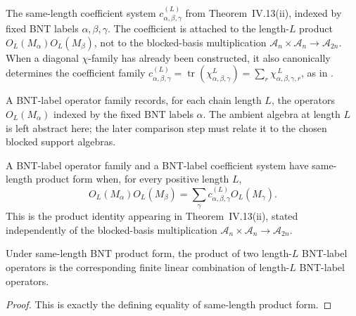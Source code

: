 \begin{definition}%
    \label{def:mpdo_bnt_label_coefficient_family}
    \leanok
    The same-length coefficient system
    $c^{(L)}_{\alpha,\beta,\gamma}$ from Theorem~IV.13(ii), indexed by
    fixed BNT labels $\alpha,\beta,\gamma$. The coefficient is attached to
    the length-$L$ product
    $O_L(M_\alpha)O_L(M_\beta)$, not to the blocked-basis multiplication
    $\mathcal A_n\times\mathcal A_n\to\mathcal A_{2n}$.
    When a diagonal $\chi$-family has already been constructed, it also
    canonically determines the coefficient family
    $c^{(L)}_{\alpha,\beta,\gamma}
        = \operatorname{tr}(\chi_{\alpha,\beta,\gamma}^{L})
        = \sum_r\chi_{\alpha,\beta,\gamma,r}^{\,L}$, as in
    \cite[Appendix~C.4]{Cirac2016MPDO_arXiv}.
\end{definition}

\begin{definition}%
    \label{def:mpdo_bnt_label_operator_family}
    \leanok
    A BNT-label operator family records, for each chain length $L$, the
    operators $O_L(M_\alpha)$ indexed by the fixed BNT labels $\alpha$.
    The ambient algebra at length $L$ is left abstract here; the later
    comparison step must relate it to the chosen blocked support algebras.
\end{definition}

\begin{definition}%
    \label{def:mpdo_bnt_label_same_length_product_form}
    \leanok
    A BNT-label operator family and a BNT-label coefficient system have
    same-length product form when, for every positive length $L$,
    \[
        O_L(M_\alpha)O_L(M_\beta)
        = \sum_\gamma
        c^{(L)}_{\alpha,\beta,\gamma} O_L(M_\gamma).
    \]
    This is the product identity appearing in Theorem~IV.13(ii), stated
    independently of the blocked-basis multiplication
    $\mathcal A_n\times\mathcal A_n\to\mathcal A_{2n}$.
\end{definition}

\begin{theorem}%
    \label{thm:mpdo_bnt_label_same_length_product_eq_sum}
    \leanok
    Under same-length BNT product form, the product of two length-$L$
    BNT-label operators is the corresponding finite linear combination of
    length-$L$ BNT-label operators.
\end{theorem}
\begin{proof}\leanok
    This is exactly the defining equality of same-length product form.
\end{proof}

